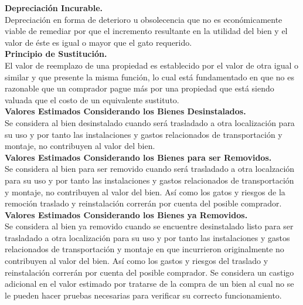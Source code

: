\textbf{Depreciación Incurable.} \\ 
Depreciación en forma de deterioro u obsolecencia que no es económicamente viable de remediar por que el incremento resultante en la utilidad del bien y el valor de éste es igual o mayor que el gato requerido. \\[6mm] 
\textbf{Principio de Sustitución.} \\ 
El valor de reemplazo de una propiedad es establecido por el valor de otra igual o similar y que presente la misma función, lo cual está fundamentado en que no es razonable que un comprador pague más por una propiedad que está siendo valuada que el costo de un equivalente sustituto. \\[6mm] 
\textbf{Valores Estimados Considerando los Bienes Desinstalados.} \\ 
Se considera al bien desinstalado cuando será trasladado a otra localización para su uso y por tanto las instalaciones y gastos relacionados de transportación y montaje, no contribuyen al valor del bien. \\[6mm] 
\textbf{Valores Estimados Considerando los Bienes para ser Removidos.} \\ 
Se considera al bien para ser removido cuando será trasladado a otra localzación para su uso y por tanto las instalaciones y gastos relacionados de transportación y montaje, no contribuyen al valor del bien.
Así como los gatos y riesgos de la remoción traslado y reinstalación correrán por cuenta del posible comprador. \\[6mm] 
\textbf{Valores Estimados Considerando los Bienes ya Removidos.} \\ 
Se considera al bien ya removido cuando se encuentre desinstalado listo para ser trasladado a otra localización para su uso y por tanto las instalaciones y gastos relacionados de transportación y montaje en que incurrieron originalmente no contribuyen al valor del bien.
Así como los gastos y riesgos del traslado y reinstalación correrán por cuenta del posible comprador.
Se considera un castigo adicional en el valor estimado por tratarse de la compra de un bien al cual no se le pueden hacer pruebas necesarias para verificar su correcto funcionamiento.


